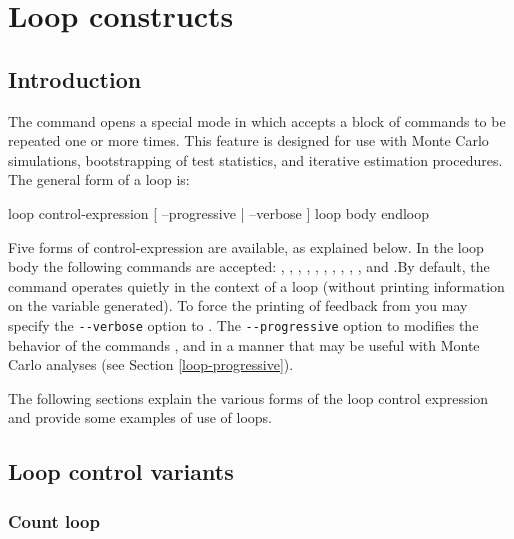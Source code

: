 \chapter{Loop constructs}
\label{looping}



\section{Introduction}
\label{loop-intro}

The command  opens a special mode in which 
accepts a block of commands to be repeated one or more times.  This
feature is designed for use with Monte Carlo simulations,
bootstrapping of test statistics, and iterative estimation procedures.
The general form of a loop is:
\begin{code}
      loop control-expression [ --progressive | --verbose ]
         loop body
      endloop
\end{code}
Five forms of control-expression are available, as explained below.
In the loop body the following commands are accepted: ,
, , , , ,
, , , ,  and
.By default, the  command operates quietly in the
context of a loop (without printing information on the variable
generated).  To force the printing of feedback from  you may
specify the \verb+--verbose+ option to .  The
\verb+--progressive+ option to  modifies the behavior of the
commands ,  and  in a manner that may
be useful with Monte Carlo analyses (see Section
\ref{loop-progressive}).
    
The following sections explain the various forms of the loop control
expression and provide some examples of use of loops.  

\section{Loop control variants}
\label{loop-control}



\subsection{Count loop}
\label{loop-count}

